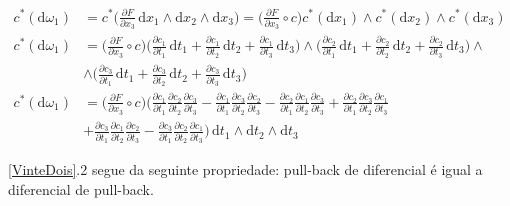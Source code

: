\documentclass[12pt,a4paper]{article}
\begin{document}
		\begin{align}
			c^*(\mathrm{d}\omega_1) &= c^*\biggl(\frac{\partial F}{\partial x_3} \,\mathrm{d}x_1 \wedge\mathrm{d}x_2 \wedge\mathrm{d}x_3\biggl) = \biggl( \frac{\partial F}{\partial x_3} \circ c \biggl) c^*(\mathrm{d}x_1) \wedge c^*(\mathrm{d}x_2) \wedge c^* (\mathrm{d}x_3) \\
			c^*(\mathrm{d}\omega_1) &= \biggl( \frac{\partial F}{\partial x_3} \circ c \biggl) \biggl(\frac{\partial c_1}{\partial t_1} \,\mathrm{d}t_1 + \frac{\partial c_1}{\partial t_2} \,\mathrm{d}t_2 + \frac{\partial c_1}{\partial t_3} \,\mathrm{d}t_3 \biggl)  
				\wedge \biggl(\frac{\partial c_2}{\partial t_1} \,\mathrm{d}t_1 + \frac{\partial c_2}{\partial t_2} \,\mathrm{d}t_2 + \frac{\partial c_2}{\partial t_3} \,\mathrm{d}t_3 \biggl) \wedge \\
				&\wedge \biggl(\frac{\partial c_3}{\partial t_1} \,\mathrm{d}t_1 + \frac{\partial c_3}{\partial t_2} \,\mathrm{d}t_2 + \frac{\partial c_3}{\partial t_3} \,\mathrm{d}t_3 \biggl)  \\
			c^*(\mathrm{d}\omega_1) &= \biggl( \frac{\partial F}{\partial x_3} \circ c \biggl) \biggl(\frac{\partial c_1}{\partial t_1} \frac{\partial c_2}{\partial t_2} \frac{\partial c_3}{\partial t_3} 
				- \frac{\partial c_1}{\partial t_1} \frac{\partial c_3}{\partial t_2} \frac{\partial c_2}{\partial t_3}
				- \frac{\partial c_2}{\partial t_1} \frac{\partial c_1}{\partial t_2} \frac{\partial c_3}{\partial t_3}
				+ \frac{\partial c_2}{\partial t_1} \frac{\partial c_3}{\partial t_2} \frac{\partial c_1}{\partial t_3} \\
				&+ \frac{\partial c_3}{\partial t_1} \frac{\partial c_1}{\partial t_2} \frac{\partial c_2}{\partial t_3} 
				- \frac{\partial c_3}{\partial t_1} \frac{\partial c_2}{\partial t_2} \frac{\partial c_1}{\partial t_3}	\biggl) \,\mathrm{d}t_1 \wedge \mathrm{d}t_2 \wedge \mathrm{d}t_3 
		\end{align}					
		
		\ref{VinteDois}.2 segue da seguinte propriedade: pull-back de diferencial \'e igual a diferencial de pull-back.
				
\end{document}
